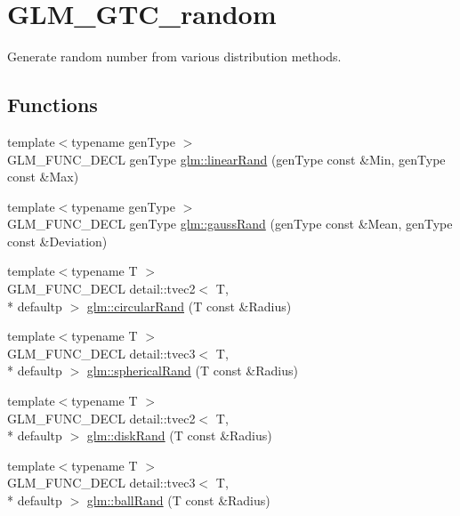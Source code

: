\hypertarget{group__gtc__random}{\section{G\-L\-M\-\_\-\-G\-T\-C\-\_\-random}
\label{group__gtc__random}
}


Generate random number from various distribution methods.  


\subsection*{Functions}
\begin{DoxyCompactItemize}
\item 
{\footnotesize template$<$typename gen\-Type $>$ }\\G\-L\-M\-\_\-\-F\-U\-N\-C\-\_\-\-D\-E\-C\-L gen\-Type \hyperlink{group__gtc__random_ga310c2e65883e62a4405128f187f41f27}{glm\-::linear\-Rand} (gen\-Type const \&Min, gen\-Type const \&Max)
\item 
{\footnotesize template$<$typename gen\-Type $>$ }\\G\-L\-M\-\_\-\-F\-U\-N\-C\-\_\-\-D\-E\-C\-L gen\-Type \hyperlink{group__gtc__random_gacba09f5b8e1e8eac3d318ae6426bbd26}{glm\-::gauss\-Rand} (gen\-Type const \&Mean, gen\-Type const \&Deviation)
\item 
{\footnotesize template$<$typename T $>$ }\\G\-L\-M\-\_\-\-F\-U\-N\-C\-\_\-\-D\-E\-C\-L detail\-::tvec2$<$ T, \\*
defaultp $>$ \hyperlink{group__gtc__random_gac1ab03c2c797ce352fd74cdb5229b151}{glm\-::circular\-Rand} (T const \&Radius)
\item 
{\footnotesize template$<$typename T $>$ }\\G\-L\-M\-\_\-\-F\-U\-N\-C\-\_\-\-D\-E\-C\-L detail\-::tvec3$<$ T, \\*
defaultp $>$ \hyperlink{group__gtc__random_ga8a9eee1fcb08690881ead242fe4259dc}{glm\-::spherical\-Rand} (T const \&Radius)
\item 
{\footnotesize template$<$typename T $>$ }\\G\-L\-M\-\_\-\-F\-U\-N\-C\-\_\-\-D\-E\-C\-L detail\-::tvec2$<$ T, \\*
defaultp $>$ \hyperlink{group__gtc__random_ga7d24fc3ef13fd7b6cad7e7b870b0e322}{glm\-::disk\-Rand} (T const \&Radius)
\item 
{\footnotesize template$<$typename T $>$ }\\G\-L\-M\-\_\-\-F\-U\-N\-C\-\_\-\-D\-E\-C\-L detail\-::tvec3$<$ T, \\*
defaultp $>$ \hyperlink{group__gtc__random_gac9c6e44b013874c291547f568d240500}{glm\-::ball\-Rand} (T const \&Radius)
\end{DoxyCompactItemize}


